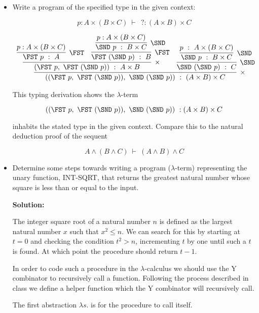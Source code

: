\documentclass[11pt]{report}
\begin{document}
\begin{itemize}
	\item Write a program of the specified type in the given context: 
	
	$$p : A \times (B \times C) \ \vdash \ ~ ? : (A \times B) \times C$$
	
	\begin{center}
		$\begin{array}{c}
			\infer[\times]{((\FST \ p, \ \FST \ (\SND \ p)), \ \SND \ (\SND \ p)) \ : \ (A \times B) \times C}
				{\infer[\times]{(\FST \ p, \ \FST \ (\SND \ p)) \ : \ A \times B}
					{\infer[\FST]{\FST \ p \ : \ A}
						{p : A \times (B\times C)}
					&
					\infer[\FST]{\FST \ (\SND \ p) \ : \ B}
						{\infer[\SND]{\SND \ p \ : \ B \times C}
							{p : A \times (B\times C)}}}
				&
				\infer[\SND]{\SND \ (\SND \ p) \ : \ C}
					{\infer[\SND]{\SND \ p \ : \ B \times C}
						{p \ : \ A \times (B\times C)}}}						
		\end{array}$
	\end{center}

	This typing derivation shows the $\lambda$-term 

	$$((\FST \ p, \ \FST \ (\SND \ p)), \ \SND \ (\SND \ p)) \ : (A\times B)\times C$$

	inhabits the stated type in the given context. Compare this to the natural deduction proof of the sequent 

	$$A \land (B \land C) \ \vdash \ (A \land B) \land C $$

	\newpage
	\item Determine some steps towards writing a program ($\lambda$-term) representing the unary function, INT-SQRT, that returns the greatest natural number whose square is less than or equal to the input. 

	{\bf Solution:}

	The integer square root of a natural number $n$ is defined as the largest natural number $x$ such that $x^{2} \leq n$. We can search for this by starting at $t = 0$ and checking the condition $t^{2} > n$, incrementing $t$ by one until such a $t$ is found. At which point the procedure should return $t-1$. 

	In order to code such a procedure in the $\lambda$-calculus we should use the Y combinator to recursively call a function. Following the process described in class we define a helper function which the Y combinator will recursively call. 

	The first abstraction $\lambda s.$ is for the procedure to call itself. 


\end{itemize}
\end{document}
